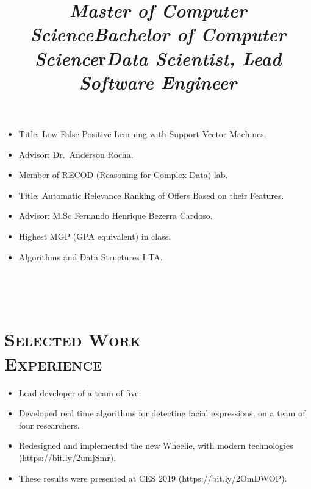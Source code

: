 \begin{resume}
\title{\emph{Master of Computer Science}}
\begin{position}
\vspace{1mm}
\begin{itemize}\small
\item Title: Low False Positive Learning with Support Vector Machines.
\item Advisor: Dr.\ Anderson Rocha.
\item Member of RECOD (Reasoning for Complex Data) lab.
\end{itemize}
\end{position}

\title{\emph{Bachelor of Computer Science}}
\begin{position}
\begin{itemize}\small
\vspace{1mm}
\item Title: Automatic Relevance Ranking of Offers Based on their Features.
\item Advisor: M.Sc Fernando Henrique Bezerra Cardoso.
\item Highest MGP (GPA equivalent) in class.
\item Algorithms and Data Structures I TA\@.
\end{itemize}
\end{position}


\begin{formatb}
  \\
  \title{r}\\
\end{formatb}

\section{\textsc{Selected Work\\Experience}}

\title{\emph{Data Scientist, Lead Software Engineer}}
\begin{position}
\vspace{1mm}
\begin{itemize}\small
\item Lead developer of a team of five.
\item Developed real time algorithms for detecting facial expressions, on a team of four researchers.
\item Redesigned and implemented the new Wheelie, with modern technologies (https://bit.ly/2umjSmr).
\item These results were presented at CES 2019 (https://bit.ly/2OmDWOP).


\end{itemize}
\end{position}
\end{resume}
